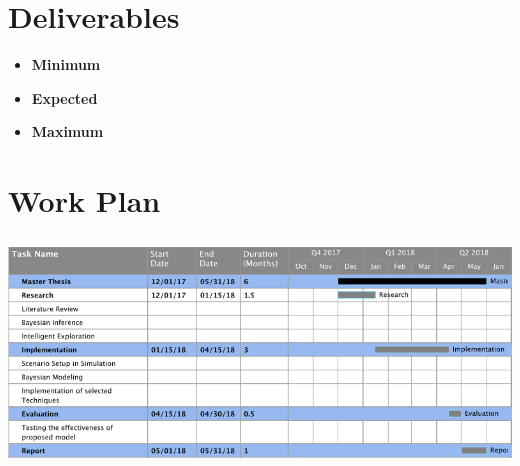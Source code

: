 \documentclass[12pt]{article}
\begin{document}
\section{Deliverables}
\begin{itemize} 
\item \textbf{Minimum}

\item \textbf{Expected}
 

\item \textbf{Maximum}

\end{itemize}

\section{Work Plan}

\includegraphics[width=\textwidth, height=6cm]{workplan.png}

\vspace*{6\baselineskip}
\newpage


\end{document}
